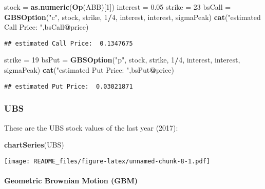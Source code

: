 \documentclass[]{article}
\newenvironment{Shaded}{\begin{snugshade}}{\end{snugshade}}
\newcommand{\KeywordTok}[1]{\textcolor[rgb]{0.13,0.29,0.53}{\textbf{#1}}}
\newcommand{\DecValTok}[1]{\textcolor[rgb]{0.00,0.00,0.81}{#1}}
\newcommand{\FloatTok}[1]{\textcolor[rgb]{0.00,0.00,0.81}{#1}}
\newcommand{\StringTok}[1]{\textcolor[rgb]{0.31,0.60,0.02}{#1}}
\newcommand{\OperatorTok}[1]{\textcolor[rgb]{0.81,0.36,0.00}{\textbf{#1}}}
\newcommand{\NormalTok}[1]{#1}
\let\oldparagraph\paragraph
\renewcommand{\paragraph}[1]{\oldparagraph{#1}\mbox{}}
\begin{document}
\begin{Shaded}
\begin{Highlighting}[]
\NormalTok{stock =}\StringTok{ }\KeywordTok{as.numeric}\NormalTok{(}\KeywordTok{Op}\NormalTok{(ABB)[}\DecValTok{1}\NormalTok{])}
\NormalTok{interest =}\StringTok{ }\FloatTok{0.05}
\NormalTok{strike =}\StringTok{ }\DecValTok{23}
\NormalTok{bsCall =}\StringTok{ }\KeywordTok{GBSOption}\NormalTok{(}\StringTok{"c"}\NormalTok{, stock, strike, }\DecValTok{1}\OperatorTok{/}\DecValTok{4}\NormalTok{, interest, interest, sigmaPeak)}
\KeywordTok{cat}\NormalTok{(}\StringTok{"estimated Call Price: "}\NormalTok{,bsCall}\OperatorTok{@}\NormalTok{price)}
\end{Highlighting}
\end{Shaded}

\begin{verbatim}
## estimated Call Price:  0.1347675
\end{verbatim}

\begin{Shaded}
\begin{Highlighting}[]
\NormalTok{strike =}\StringTok{ }\DecValTok{19}
\NormalTok{bsPut =}\StringTok{ }\KeywordTok{GBSOption}\NormalTok{(}\StringTok{"p"}\NormalTok{, stock, strike, }\DecValTok{1}\OperatorTok{/}\DecValTok{4}\NormalTok{, interest, interest, sigmaPeak)}
\KeywordTok{cat}\NormalTok{(}\StringTok{"estimated Put Price: "}\NormalTok{,bsPut}\OperatorTok{@}\NormalTok{price)}
\end{Highlighting}
\end{Shaded}

\begin{verbatim}
## estimated Put Price:  0.03021871
\end{verbatim}

\subsubsection{UBS}\label{ubs}

These are the UBS stock values of the last year (2017):

\begin{Shaded}
\begin{Highlighting}[]
\KeywordTok{chartSeries}\NormalTok{(UBS)}
\end{Highlighting}
\end{Shaded}

\texttt{[image: README\_files/figure-latex/unnamed-chunk-8-1.pdf]}

\paragraph{Geometric Brownian Motion
(GBM)}\label{geometric-brownian-motion-gbm-1}
\end{document}
